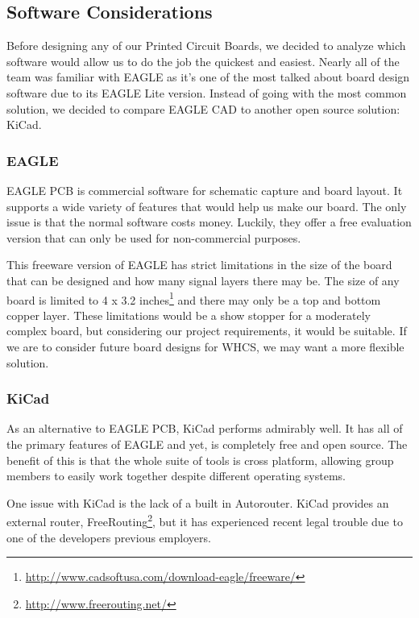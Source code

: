 
\subsection{Software Considerations}
Before designing any of our Printed Circuit Boards, we decided to analyze which
software would allow us to do the job the quickest and easiest. Nearly all of
the team was familiar with EAGLE as it's one of the most talked about board
design software due to its EAGLE Lite version. Instead of going with the most
common solution, we decided to compare EAGLE CAD to another open source
solution: KiCad.

\subsubsection{EAGLE}
EAGLE PCB is commercial software for schematic capture and board layout. It
supports a wide variety of features that would help us make our board. The only
issue is that the normal software costs money. Luckily, they offer a free
evaluation version that can only be used for non-commercial purposes.

This freeware version of EAGLE has strict limitations in the size of the board
that can be designed and how many signal layers there may be. The size of any
board is limited to 4 x 3.2
inches\footnote{\url{http://www.cadsoftusa.com/download-eagle/freeware/}} and
there may only be a top and bottom copper layer. These limitations would be a
show stopper for a moderately complex board, but considering our project
requirements, it would be suitable.  If we are to consider future board designs
for WHCS, we may want a more flexible solution.

\subsubsection{KiCad}
As an alternative to EAGLE PCB, KiCad performs admirably well. It has all of
the primary features of EAGLE and yet, is completely free and open source. The benefit of this is that the whole suite of tools is cross platform, allowing group members to easily work together despite different operating systems.

One issue with KiCad is the lack of a built in Autorouter. KiCad provides an external router, FreeRouting\footnote{\url{http://www.freerouting.net/}}, but it has experienced recent legal trouble due to one of the developers previous employers.

